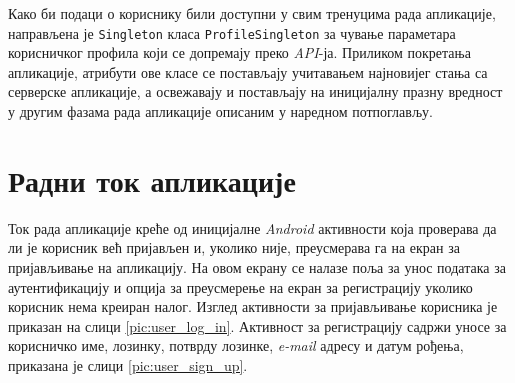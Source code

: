 \documentclass[12pt,oneside]{memoir}
\begin{document}
Како би подаци о кориснику били доступни у свим тренуцима рада апликације, направљена је \texttt{Singleton} класа \texttt{ProfileSingleton} за чување параметара корисничког профила који се допремају преко \textit{API}-ја. Приликом покретања апликације, атрибути ове класе се постављају учитавањем најновијег стања са серверске апликације, а освежавају и постављају на иницијалну празну вредност у другим фазама рада апликације описаним у наредном потпоглављу.


\section{Радни ток апликације}

Ток рада апликације креће од иницијалне \textit{Android} активности која проверава да ли је корисник већ пријављен и, уколико није, преусмерава га на екран за пријављивање на апликацију. На овом екрану се налазе поља за унос података за аутентификацију и опција за преусмерење на екран за регистрацију уколико корисник нема креиран налог. Изглед активности за пријављивање корисника је приказан на слици \ref{pic:user_log_in}.
Активност за регистрацију садржи уносе за корисничко име, лозинку, потврду лозинке, \textit{e-mail} адресу и датум рођења, приказана је слици \ref{pic:user_sign_up}.
\end{document}
